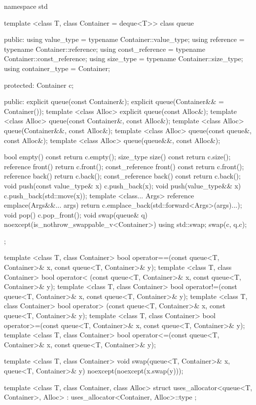 \begin{codeblock}
namespace std {
  template <class T, class Container = deque<T>>
  class queue {
  public:
    using value_type      = typename Container::value_type;
    using reference       = typename Container::reference;
    using const_reference = typename Container::const_reference;
    using size_type       = typename Container::size_type;
    using container_type  =          Container;

  protected:
    Container c;

  public:
    explicit queue(const Container&);
    explicit queue(Container&& = Container());
    template <class Alloc> explicit queue(const Alloc&);
    template <class Alloc> queue(const Container&, const Alloc&);
    template <class Alloc> queue(Container&&, const Alloc&);
    template <class Alloc> queue(const queue&, const Alloc&);
    template <class Alloc> queue(queue&&, const Alloc&);

    bool              empty() const     { return c.empty(); }
    size_type         size()  const     { return c.size(); }
    reference         front()           { return c.front(); }
    const_reference   front() const     { return c.front(); }
    reference         back()            { return c.back(); }
    const_reference   back() const      { return c.back(); }
    void push(const value_type& x)      { c.push_back(x); }
    void push(value_type&& x)           { c.push_back(std::move(x)); }
    template <class... Args>
      reference emplace(Args&&... args) { return c.emplace_back(std::forward<Args>(args)...); }
    void pop()                          { c.pop_front(); }
    void swap(queue& q) noexcept(is_nothrow_swappable_v<Container>)
      { using std::swap; swap(c, q.c); }
  };

  template <class T, class Container>
    bool operator==(const queue<T, Container>& x, const queue<T, Container>& y);
  template <class T, class Container>
    bool operator< (const queue<T, Container>& x, const queue<T, Container>& y);
  template <class T, class Container>
    bool operator!=(const queue<T, Container>& x, const queue<T, Container>& y);
  template <class T, class Container>
    bool operator> (const queue<T, Container>& x, const queue<T, Container>& y);
  template <class T, class Container>
    bool operator>=(const queue<T, Container>& x, const queue<T, Container>& y);
  template <class T, class Container>
    bool operator<=(const queue<T, Container>& x, const queue<T, Container>& y);

  template <class T, class Container>
    void swap(queue<T, Container>& x, queue<T, Container>& y) noexcept(noexcept(x.swap(y)));

  template <class T, class Container, class Alloc>
    struct uses_allocator<queue<T, Container>, Alloc>
      : uses_allocator<Container, Alloc>::type { };
}
\end{codeblock}

